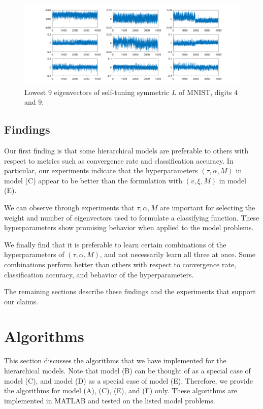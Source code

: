 \documentclass{siamart1116}
\begin{document}
            \begin{figure}[!htb]
            \centering
            \caption{\label{fig:mnist_spec} Lowest $9$ eigenvectors of self-tuning symmetric $L$ of MNIST, digits $4$ and $9$.}
            \includegraphics[width=0.5\linewidth]{laplacians/mnist_laplacian.png}
            \end{figure}

    \subsection{Findings}
        Our first finding is that some hierarchical models are preferable to others with respect to metrics such as convergence rate and classification accuracy. In particular, our experiments indicate that the hyperparameters $(\tau, \alpha, M)$ in model (C) appear to be better than the formulation with $(v, \xi, M)$ in model (E).

        We can observe through experiments that $\tau, \alpha, M$ are important for selecting the weight and number of eigenvectors used to formulate a classifying function. These hyperparameters show promising behavior when applied to the model problems.

        We finally find that it is preferable to learn certain combinations of the hyperparameters of $(\tau, \alpha, M)$, and not necessarily learn all three at once. Some combinations perform better than others with respect to convergence rate, classification accuracy, and behavior of the hyperparameters.

        The remaining sections describe these findings and the experiments that support our claims.

\section{Algorithms}
    This section discusses the algorithms that we have implemented for the hierarchical models. Note that model (B) can be thought of as a special case of model (C), and model (D) as a special case of model (E). Therefore, we provide the algorithms for model (A), (C), (E), and (F) only. These algorithms are implemented in MATLAB and tested on the listed model problems.
\end{document}
